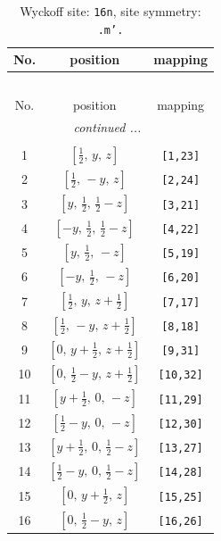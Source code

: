 \documentclass[fleqn,8pt]{jsarticle}
\begin{document}
\renewcommand{\arraystretch}{1.2}
\begin{longtable}{ccc}
\caption{Wyckoff site: {\tt 16n}, site symmetry: {\tt .m'.}}
 \\
 \hline \hline
No. & position & mapping \\ \hline \endfirsthead

\multicolumn{2}{l}{\tablename\ \thetable{}} \\
 \hline \hline
No. & position & mapping \\ \hline \endhead

 \hline \hline
\multicolumn{2}{r}{\footnotesize\it continued ...} \\ \endfoot

 \hline \hline
\multicolumn{2}{r}{} \\ \endlastfoot

1 & $\left[ \frac{1}{2},\, y,\, z \right]$ & {\tt [1,23]} \\ \hline
2 & $\left[ \frac{1}{2},\, - y,\, z \right]$ & {\tt [2,24]} \\ \hline
3 & $\left[ y,\, \frac{1}{2},\, \frac{1}{2} - z \right]$ & {\tt [3,21]} \\ \hline
4 & $\left[ - y,\, \frac{1}{2},\, \frac{1}{2} - z \right]$ & {\tt [4,22]} \\ \hline
5 & $\left[ y,\, \frac{1}{2},\, - z \right]$ & {\tt [5,19]} \\ \hline
6 & $\left[ - y,\, \frac{1}{2},\, - z \right]$ & {\tt [6,20]} \\ \hline
7 & $\left[ \frac{1}{2},\, y,\, z + \frac{1}{2} \right]$ & {\tt [7,17]} \\ \hline
8 & $\left[ \frac{1}{2},\, - y,\, z + \frac{1}{2} \right]$ & {\tt [8,18]} \\ \hline
9 & $\left[ 0,\, y + \frac{1}{2},\, z + \frac{1}{2} \right]$ & {\tt [9,31]} \\ \hline
10 & $\left[ 0,\, \frac{1}{2} - y,\, z + \frac{1}{2} \right]$ & {\tt [10,32]} \\ \hline
11 & $\left[ y + \frac{1}{2},\, 0,\, - z \right]$ & {\tt [11,29]} \\ \hline
12 & $\left[ \frac{1}{2} - y,\, 0,\, - z \right]$ & {\tt [12,30]} \\ \hline
13 & $\left[ y + \frac{1}{2},\, 0,\, \frac{1}{2} - z \right]$ & {\tt [13,27]} \\ \hline
14 & $\left[ \frac{1}{2} - y,\, 0,\, \frac{1}{2} - z \right]$ & {\tt [14,28]} \\ \hline
15 & $\left[ 0,\, y + \frac{1}{2},\, z \right]$ & {\tt [15,25]} \\ \hline
16 & $\left[ 0,\, \frac{1}{2} - y,\, z \right]$ & {\tt [16,26]} \\
\end{longtable}
\end{document}
